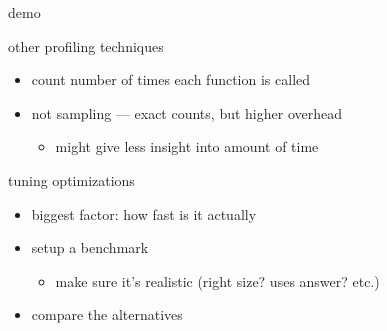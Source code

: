 \begin{frame}{demo}
\end{frame}

\begin{frame}{other profiling techniques}
    \begin{itemize}
    \item count number of times each function is called
    \item not sampling --- exact counts, but higher overhead
        \begin{itemize}
        \item might give less insight into amount of time
        \end{itemize}
    \end{itemize}
\end{frame}

\begin{frame}{tuning optimizations}
    \begin{itemize}
    \item biggest factor: how fast is it actually
    \item setup a benchmark 
        \begin{itemize}
        \item make sure it's realistic (right size? uses answer? etc.)
        \end{itemize}
    \item compare the alternatives
    \end{itemize}
\end{frame}
